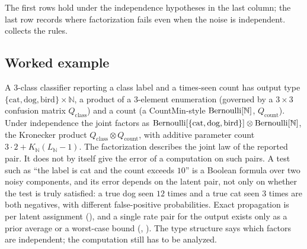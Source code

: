 The first rows hold under the independence hypotheses in the last column; the
last row records where factorization fails even when the noise is independent.
 collects the rules.

\subsection*{Worked example}

A 3-class classifier reporting a class label and a times-seen count has output
type $\{\text{cat}, \text{dog}, \text{bird}\} \times \mathbb{N}$, a product of a
3-element enumeration (governed by a $3 \times 3$ confusion matrix
$Q_{\text{class}}$) and a count (a CountMin-style $\mathrm{Bernoulli}[\mathbb{N}]$,
$Q_{\text{count}}$). Under independence the joint factors as
$\mathrm{Bernoulli}[\{\text{cat}, \text{dog}, \text{bird}\}] \otimes
\mathrm{Bernoulli}[\mathbb{N}]$, the Kronecker product $Q_{\text{class}} \otimes
Q_{\text{count}}$, with additive parameter count $3 \cdot 2 + K_{\mathbb{N}}
(L_{\mathbb{N}} - 1)$. The factorization describes the joint law of the reported
pair. It does not by itself give the error of a computation on such pairs. A
test such as ``the label is cat and the count exceeds $10$'' is a Boolean
formula over two noisy components, and its error depends on the latent pair,
not only on whether the test is truly satisfied: a true dog seen $12$ times and
a true cat seen $3$ times are both negatives, with different false-positive
probabilities. Exact propagation is per latent
assignment
(), and a single rate pair for the output exists
only as a prior average or a worst-case bound
(, ). The
type structure says which factors are independent; the computation still has to
be analyzed.
